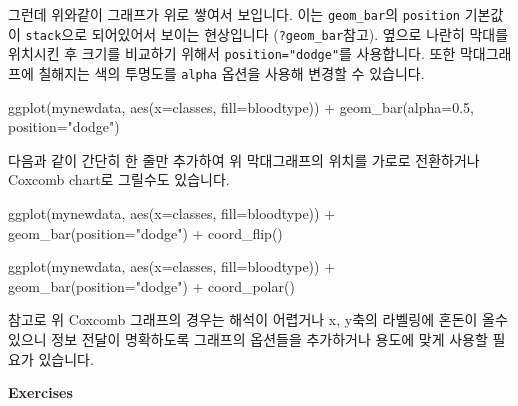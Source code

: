 \documentclass[
]{book}
\newenvironment{Shaded}{\begin{snugshade}}{\end{snugshade}}
\newcommand{\AttributeTok}[1]{\textcolor[rgb]{0.77,0.63,0.00}{#1}}
\newcommand{\FloatTok}[1]{\textcolor[rgb]{0.00,0.00,0.81}{#1}}
\newcommand{\FunctionTok}[1]{\textcolor[rgb]{0.00,0.00,0.00}{#1}}
\newcommand{\NormalTok}[1]{#1}
\newcommand{\SpecialCharTok}[1]{\textcolor[rgb]{0.00,0.00,0.00}{#1}}
\newcommand{\StringTok}[1]{\textcolor[rgb]{0.31,0.60,0.02}{#1}}
\begin{document}
그런데 위와같이 그래프가 위로 쌓여서 보입니다. 이는 \texttt{geom\_bar}의 \texttt{position} 기본값이 \texttt{stack}으로 되어있어서 보이는 현상입니다 (\texttt{?geom\_bar}참고). 옆으로 나란히 막대를 위치시킨 후 크기를 비교하기 위해서 \texttt{position="dodge"}를 사용합니다. 또한 막대그래프에 칠해지는 색의 투명도를 \texttt{alpha} 옵션을 사용해 변경할 수 있습니다.

\begin{Shaded}
\begin{Highlighting}[]
\FunctionTok{ggplot}\NormalTok{(mynewdata, }\FunctionTok{aes}\NormalTok{(}\AttributeTok{x=}\NormalTok{classes, }\AttributeTok{fill=}\NormalTok{bloodtype)) }\SpecialCharTok{+}
  \FunctionTok{geom\_bar}\NormalTok{(}\AttributeTok{alpha=}\FloatTok{0.5}\NormalTok{, }\AttributeTok{position=}\StringTok{"dodge"}\NormalTok{)}
\end{Highlighting}
\end{Shaded}

다음과 같이 간단히 한 줄만 추가하여 위 막대그래프의 위치를 가로로 전환하거나 Coxcomb chart로 그릴수도 있습니다.

\begin{Shaded}
\begin{Highlighting}[]
\FunctionTok{ggplot}\NormalTok{(mynewdata, }\FunctionTok{aes}\NormalTok{(}\AttributeTok{x=}\NormalTok{classes, }\AttributeTok{fill=}\NormalTok{bloodtype)) }\SpecialCharTok{+}
  \FunctionTok{geom\_bar}\NormalTok{(}\AttributeTok{position=}\StringTok{"dodge"}\NormalTok{) }\SpecialCharTok{+}
  \FunctionTok{coord\_flip}\NormalTok{()}
\end{Highlighting}
\end{Shaded}

\begin{Shaded}
\begin{Highlighting}[]
\FunctionTok{ggplot}\NormalTok{(mynewdata, }\FunctionTok{aes}\NormalTok{(}\AttributeTok{x=}\NormalTok{classes, }\AttributeTok{fill=}\NormalTok{bloodtype)) }\SpecialCharTok{+}
  \FunctionTok{geom\_bar}\NormalTok{(}\AttributeTok{position=}\StringTok{"dodge"}\NormalTok{) }\SpecialCharTok{+}
  \FunctionTok{coord\_polar}\NormalTok{()}
\end{Highlighting}
\end{Shaded}

참고로 위 Coxcomb 그래프의 경우는 해석이 어렵거나 x, y축의 라벨링에 혼돈이 올수 있으니 정보 전달이 명확하도록 그래프의 옵션들을 추가하거나 용도에 맞게 사용할 필요가 있습니다.

\textbf{Exercises}
\end{document}

